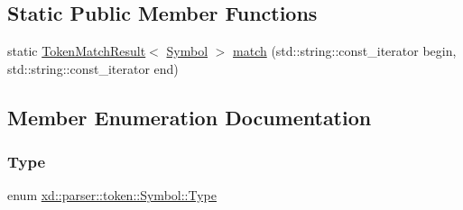 \subsection*{Static Public Member Functions}
\begin{DoxyCompactItemize}
\item 
static \mbox{\hyperlink{namespacexd_1_1parser_1_1token_a766c52bbfb7cb1f08498ef0bb9ec756e}{Token\+Match\+Result}}$<$ \mbox{\hyperlink{classxd_1_1parser_1_1token_1_1_symbol}{Symbol}} $>$ \mbox{\hyperlink{classxd_1_1parser_1_1token_1_1_symbol_a57e1cb950876f81ce476f9dbc2a52cbb}{match}} (std\+::string\+::const\+\_\+iterator begin, std\+::string\+::const\+\_\+iterator end)
\end{DoxyCompactItemize}


\subsection{Member Enumeration Documentation}
\mbox{\label{classxd_1_1parser_1_1token_1_1_symbol_a1ccd1a684e22809f543b496a29564483}} 
\subsubsection{\texorpdfstring{Type}{Type}}
{\footnotesize\ttfamily enum \mbox{\hyperlink{classxd_1_1parser_1_1token_1_1_symbol_a1ccd1a684e22809f543b496a29564483}{xd\+::parser\+::token\+::\+Symbol\+::\+Type}}\hspace{0.3cm}{\ttfamily [strong]}}

